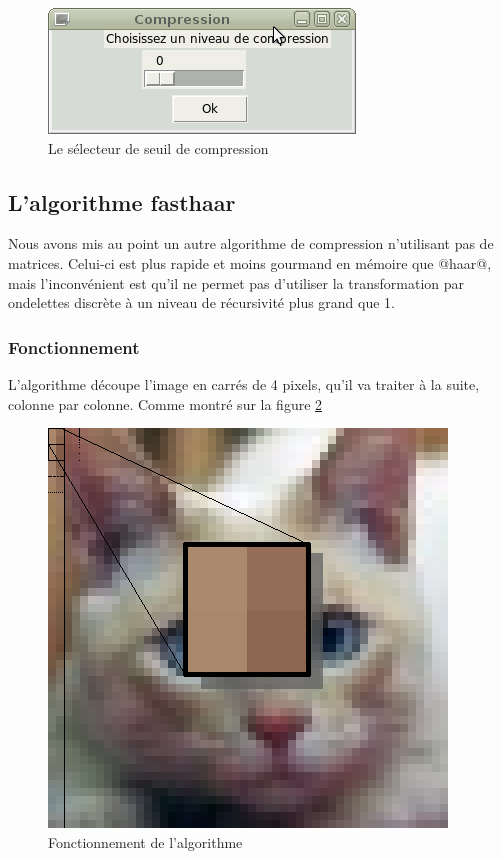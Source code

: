 \documentclass{article}
\begin{document}
\begin{figure}[!hb]
\centering
\includegraphics[scale=0.8]{images/Compression.png}
\caption{Le sélecteur de seuil de compression}
\label{GUI2}
\end{figure}



\cleardoublepage

\subsection{L'algorithme fasthaar}

Nous avons mis au point un autre algorithme de compression n'utilisant pas de matrices. Celui-ci est plus rapide et moins gourmand en mémoire que @haar@, mais l'inconvénient est qu'il ne permet pas d'utiliser la transformation par ondelettes discrète à un niveau de récursivité plus grand que 1.

\subsubsection{Fonctionnement}

L'algorithme découpe l'image en carrés de 4 pixels, qu'il va traiter à la suite, colonne par colonne. Comme montré sur la figure \ref{algo}

\begin{figure}[!h]
\centering
\includegraphics[scale=0.8]{images/minichat.jpg}
\caption{Fonctionnement de l'algorithme}
\label{algo}
\end{figure}
\end{document}
